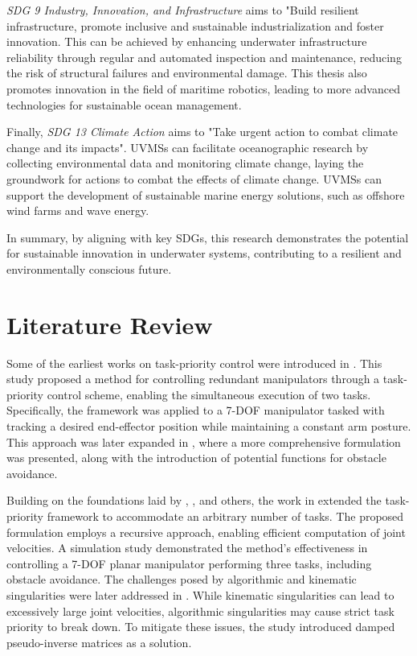 \emph{SDG 9 Industry, Innovation, and Infrastructure} aims to "Build resilient
infrastructure, promote inclusive and sustainable industrialization and foster
innovation. This can be achieved by enhancing underwater infrastructure reliability
through regular and automated inspection and maintenance, reducing the risk of
structural failures and environmental damage. This thesis also promotes innovation
in the field of maritime robotics, leading to more advanced technologies for
sustainable ocean management.

Finally, \emph{SDG 13 Climate Action} aims to "Take urgent action to combat climate
change and its impacts". UVMSs can facilitate oceanographic research by collecting
environmental data and monitoring climate change, laying the groundwork for actions
to combat the effects of climate change. UVMSs can support the development of
sustainable marine energy solutions, such as offshore wind farms and wave energy.

In summary, by aligning with key SDGs, this research demonstrates the potential
for sustainable innovation in underwater systems, contributing to a resilient 
and environmentally conscious future.

\section{Literature Review}

Some of the earliest works on task-priority control were introduced in 
\cite{hanafusa1981}. This study proposed a method for controlling redundant 
manipulators through a task-priority control scheme, enabling the simultaneous 
execution of two tasks. Specifically, the framework was applied to a 7-DOF 
manipulator tasked with tracking a desired end-effector position while 
maintaining a constant arm posture. This approach was later expanded in 
\cite{nakamura1987}, where a more comprehensive formulation was presented, 
along with the introduction of potential functions for obstacle avoidance.

Building on the foundations laid by \cite{hanafusa1981}, \cite{nakamura1987}, 
and others, the work in \cite{siciliano1991} extended the task-priority 
framework to accommodate an arbitrary number of tasks. The proposed formulation 
employs a recursive approach, enabling efficient computation of joint 
velocities. A simulation study demonstrated the method's effectiveness in 
controlling a 7-DOF planar manipulator performing three tasks, including 
obstacle avoidance. The challenges posed by algorithmic and kinematic 
singularities were later addressed in \cite{chiaverini1997}. While kinematic 
singularities can lead to excessively large joint velocities, algorithmic 
singularities may cause strict task priority to break down. To mitigate these 
issues, the study introduced damped pseudo-inverse matrices as a solution.

